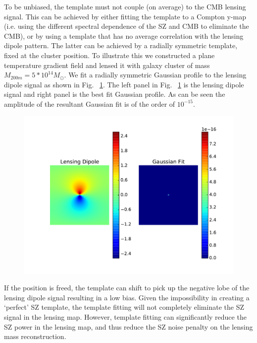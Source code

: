 {To be unbiased, the template must not couple (on average) to the  CMB lensing signal. 
This can be achieved by either fitting the template to a Compton  y-map (i.e. using the different spectral dependence of the SZ and CMB to eliminate the CMB), or by using a template that has no average correlation with the lensing dipole pattern. 
The latter can be achieved by a radially symmetric template, fixed at the cluster position.
To illustrate this we constructed a plane temperature gradient field and lensed it with galaxy cluster of mass $M_{200m} = 5*10^{14}M_{\odot}$. 
We fit a radially symmetric Gaussian profile to the lensing dipole signal as shown in Fig. ~\ref{fig:no_bias}. 
 The left panel in Fig. ~\ref{fig:no_bias} is the lensing dipole signal and right panel is the best fit Gaussian profile. 
 As can be seen the amplitude of the resultant Gaussian fit is of the order of $10^{-15}$.

\begin{figure}
\includegraphics[width=\linewidth]{figs/template_fitting_bias.pdf}
 \caption{
 } 
\label{fig:no_bias}
\end{figure}

If the position is freed, the template can shift to pick up the negative lobe of the lensing dipole signal resulting in a low bias. 
Given the impossibility in creating a `perfect' SZ template, the template fitting will not completely eliminate the SZ signal in the lensing map. 
However, template fitting can significantly reduce the SZ power in the lensing map, and thus reduce the SZ noise penalty on the lensing mass reconstruction. 

}
